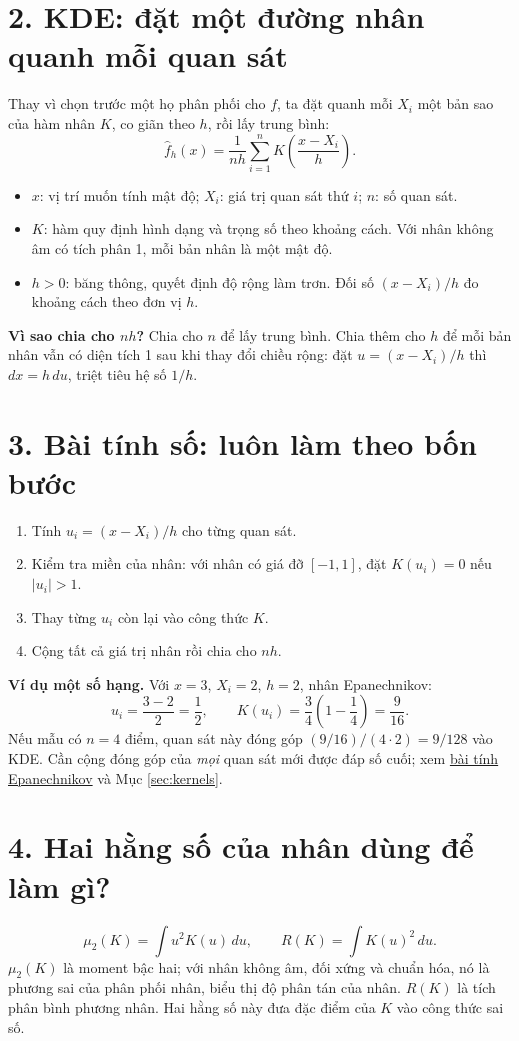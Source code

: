\documentclass[11pt,a4paper]{article}
\begin{document}
\section*{2. KDE: đặt một đường nhân quanh mỗi quan sát}
Thay vì chọn trước một họ phân phối cho $f$, ta đặt quanh mỗi $X_i$ một bản sao của hàm nhân $K$, co giãn theo $h$, rồi lấy trung bình:
\[
\boxed{\widehat f_h(x)=\frac1{nh}\sum_{i=1}^nK\!\left(\frac{x-X_i}{h}\right).}
\]
\begin{itemize}
\item $x$: vị trí muốn tính mật độ; $X_i$: giá trị quan sát thứ $i$; $n$: số quan sát.
\item $K$: hàm quy định hình dạng và trọng số theo khoảng cách. Với nhân không âm có tích phân 1, mỗi bản nhân là một mật độ.
\item $h>0$: băng thông, quyết định độ rộng làm trơn. Đối số $(x-X_i)/h$ đo khoảng cách theo đơn vị $h$.
\end{itemize}
\textbf{Vì sao chia cho $nh$?} Chia cho $n$ để lấy trung bình. Chia thêm cho $h$ để mỗi bản nhân vẫn có diện tích 1 sau khi thay đổi chiều rộng: đặt $u=(x-X_i)/h$ thì $dx=h\,du$, triệt tiêu hệ số $1/h$.

\section*{3. Bài tính số: luôn làm theo bốn bước}
\begin{enumerate}
\item Tính $u_i=(x-X_i)/h$ cho từng quan sát.
\item Kiểm tra miền của nhân: với nhân có giá đỡ $[-1,1]$, đặt $K(u_i)=0$ nếu $|u_i|>1$.
\item Thay từng $u_i$ còn lại vào công thức $K$.
\item Cộng tất cả giá trị nhân rồi chia cho $nh$.
\end{enumerate}
\textbf{Ví dụ một số hạng.} Với $x=3$, $X_i=2$, $h=2$, nhân Epanechnikov:
\[
u_i=\frac{3-2}{2}=\frac12,\qquad
K(u_i)=\frac34\left(1-\frac14\right)=\frac9{16}.
\]
Nếu mẫu có $n=4$ điểm, quan sát này đóng góp $(9/16)/(4\cdot2)=9/128$ vào KDE. Cần cộng đóng góp của \emph{mọi} quan sát mới được đáp số cuối; xem \hyperref[core:calculation]{bài tính Epanechnikov} và Mục \ref{sec:kernels}.

\clearpage
\section*{4. Hai hằng số của nhân dùng để làm gì?}
\[
\mu_2(K)=\int u^2K(u)\,du,\qquad R(K)=\int K(u)^2\,du.
\]
$\mu_2(K)$ là moment bậc hai; với nhân không âm, đối xứng và chuẩn hóa, nó là phương sai của phân phối nhân, biểu thị độ phân tán của nhân. $R(K)$ là tích phân bình phương nhân. Hai hằng số này đưa đặc điểm của $K$ vào công thức sai số.
\end{document}
